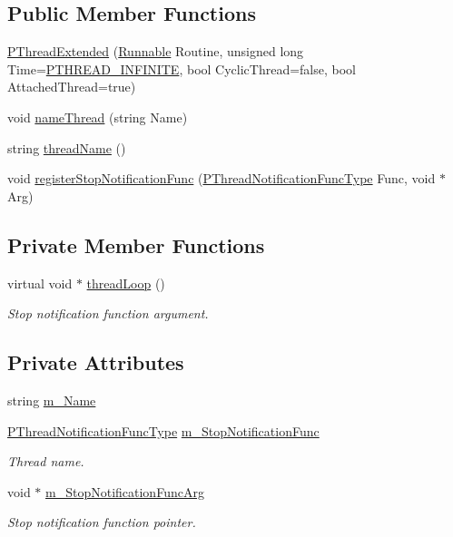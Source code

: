 \subsection*{Public Member Functions}
\begin{DoxyCompactItemize}
\item 
\hyperlink{classPThreadExtended_a7bbc8901875c01e475b7a1637e176cad}{P\+Thread\+Extended} (\hyperlink{structRunnable}{Runnable} Routine, unsigned long Time=\hyperlink{PThreadClassLib_8h_a9d2d74d73cb5d069fbfcbcfebf42bd6e}{P\+T\+H\+R\+E\+A\+D\+\_\+\+I\+N\+F\+I\+N\+I\+TE}, bool Cyclic\+Thread=false, bool Attached\+Thread=true)
\item 
void \hyperlink{classPThreadExtended_a1df3e69e3cfae6f56e12da3ce80446d4}{name\+Thread} (string Name)
\item 
string \hyperlink{classPThreadExtended_a3c49f906e273860f45c44b5a988cf139}{thread\+Name} ()
\item 
void \hyperlink{classPThreadExtended_aa9a16de484a20e787223ee8750e6d7c1}{register\+Stop\+Notification\+Func} (\hyperlink{group__FUNC__DEFS_ga164076b53d35e4dba4c51bb336c15dab}{P\+Thread\+Notification\+Func\+Type} Func, void $\ast$Arg)
\end{DoxyCompactItemize}
\subsection*{Private Member Functions}
\begin{DoxyCompactItemize}
\item 
virtual void $\ast$ \hyperlink{classPThreadExtended_a43d31ca653ffe314e400a48a77f8e0a9}{thread\+Loop} ()
\begin{DoxyCompactList}\small\item\em Stop notification function argument. \end{DoxyCompactList}\end{DoxyCompactItemize}
\subsection*{Private Attributes}
\begin{DoxyCompactItemize}
\item 
string \hyperlink{classPThreadExtended_a43d72651db43fda0d627e87ca2a71ba3}{m\+\_\+\+Name}
\item 
\hyperlink{group__FUNC__DEFS_ga164076b53d35e4dba4c51bb336c15dab}{P\+Thread\+Notification\+Func\+Type} \hyperlink{classPThreadExtended_ae922e8bf6a63ea08521785c1875e02e2}{m\+\_\+\+Stop\+Notification\+Func}
\begin{DoxyCompactList}\small\item\em Thread name. \end{DoxyCompactList}\item 
void $\ast$ \hyperlink{classPThreadExtended_a666cf4f4189eb9dc04b2aa42da0f4acd}{m\+\_\+\+Stop\+Notification\+Func\+Arg}
\begin{DoxyCompactList}\small\item\em Stop notification function pointer. \end{DoxyCompactList}\end{DoxyCompactItemize}
